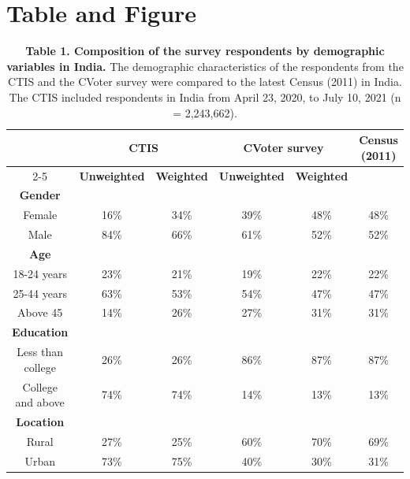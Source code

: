 \documentclass{article}
\begin{document}
\pagebreak

\section{Table and Figure}

\begin{table}[H]
\centering
\begin{tabular}{|c|cc|cc|c|}
\hline
\multirow{2}{*}{} &
  \multicolumn{2}{c|}{\textbf{CTIS}} &
  \multicolumn{2}{c|}{\textbf{CVoter survey}} &
  \multirow{2}{*}{\textbf{Census (2011)}} \\ \cline{2-5}
 &
  \multicolumn{1}{c|}{\textbf{Unweighted}} &
  \textbf{Weighted} &
  \multicolumn{1}{c|}{\textbf{Unweighted}} &
  \textbf{Weighted} &
   \\ \hline
\textbf{Gender}    & \multicolumn{1}{c|}{}     &      & \multicolumn{1}{c|}{}     &      &      \\ \hline
Female             & \multicolumn{1}{c|}{16\%} & 34\% & \multicolumn{1}{c|}{39\%} & 48\% & 48\% \\ \hline
Male               & \multicolumn{1}{c|}{84\%} & 66\% & \multicolumn{1}{c|}{61\%} & 52\% & 52\% \\ \hline
\textbf{Age}       & \multicolumn{1}{c|}{}     &      & \multicolumn{1}{c|}{}     &      &      \\ \hline
18-24 years        & \multicolumn{1}{c|}{23\%} & 21\% & \multicolumn{1}{c|}{19\%} & 22\% & 22\% \\ \hline
25-44 years        & \multicolumn{1}{c|}{63\%} & 53\% & \multicolumn{1}{c|}{54\%} & 47\% & 47\% \\ \hline
Above 45           & \multicolumn{1}{c|}{14\%} & 26\% & \multicolumn{1}{c|}{27\%} & 31\% & 31\% \\ \hline
\textbf{Education} & \multicolumn{1}{c|}{}     &      & \multicolumn{1}{c|}{}     &      &      \\ \hline
Less than college  & \multicolumn{1}{c|}{26\%} & 26\% & \multicolumn{1}{c|}{86\%} & 87\% & 87\% \\ \hline
College and above  & \multicolumn{1}{c|}{74\%} & 74\% & \multicolumn{1}{c|}{14\%} & 13\% & 13\% \\ \hline
\textbf{Location}  & \multicolumn{1}{c|}{}     &      & \multicolumn{1}{c|}{}     &      &      \\ \hline
Rural              & \multicolumn{1}{c|}{27\%} & 25\% & \multicolumn{1}{c|}{60\%} & 70\% & 69\% \\ \hline
Urban              & \multicolumn{1}{c|}{73\%} & 75\% & \multicolumn{1}{c|}{40\%} & 30\% & 31\% \\ \hline
\end{tabular} \\
\captionsetup{labelformat=empty, singlelinecheck = off}
\caption{\textbf{Table 1. Composition of the survey respondents by demographic variables in India.} The demographic characteristics of the respondents from the CTIS and the CVoter survey were compared to the latest Census (2011) in India. The CTIS included respondents in India from April 23, 2020, to July 10, 2021 (n = 2,243,662).}
\end{table}
\end{document}
